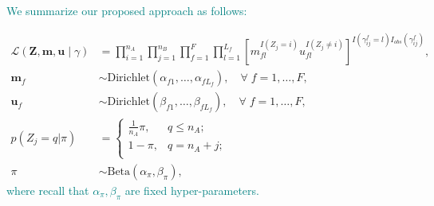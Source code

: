\documentclass[ba]{imsart}
\begin{document}


\textcolor{teal}{We summarize our proposed approach as follows:} 

\begin{subequations}
\begin{align}
	\mathcal{L}(\bm{Z}, \bm{m}, \bm{u} \mid \gamma) &= \prod_{i=1}^{n_A}  \prod_{j=1}^{n_B}\prod_{f=1}^{F}\prod_{l=1}^{L_f}\left[  m_{fl}^{I(Z_j = i)}u_{fl}^{I(Z_j \neq i)}\right]^{I(\gamma_{ij}^f = l)I_{obs}(\gamma_{ij}^f)}, \label{eqn:likelihood}\\
	\bm{m}_f &\sim \text{Dirichlet}(\alpha_{f1}, \ldots, \alpha_{f L_f}),\quad  \forall  \; f = 1, \ldots, F, \label{eqn:m} \\
	\bm{u}_f &\sim \text{Dirichlet}(\beta_{f1}, \ldots, \beta_{f L_f}), \quad \forall \; f = 1, \ldots, F,  \label{eqn:u}\\
	p(Z_j = q| \pi)  &=
	\begin{cases} 
		\frac{1}{n_A}\pi,  & q \leq n_A; \\
		1-\pi, &  q  = n_A + j; \\
	\end{cases} \label{eqn:z}\\
	\pi &\sim \text{Beta}(\alpha_{\pi}, \beta_{\pi})\label{eqn:pi},
\end{align}
\end{subequations}
\textcolor{teal}{where recall that $\alpha_{\pi}, \beta_{\pi}$ are fixed hyper-parameters.} 
\end{document}
